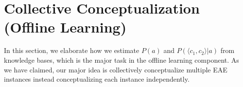 %
%
%
%
%
%
%
%
%
%
%
%
%

\section{Collective Conceptualization (Offline Learning)}
In this section, we elaborate how we estimate $P(a)$ and $P( \langle c_{1},c_{2} \rangle |a)$ from knowledge bases, which is the major task in the offline learning component. As we have claimed, our major idea is collectively conceptualize multiple EAE instances instead conceptualizing each instance independently.


